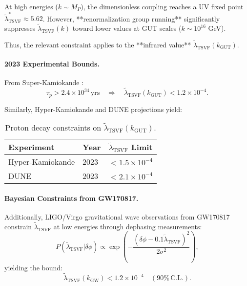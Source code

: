 \documentclass[twocolumn,superscriptaddress,floatfix]{revtex4-2}
\begin{document}
At high energies ($k \sim M_P$), the dimensionless coupling reaches a UV fixed point $\tilde{\lambda}_{\text{TSVF}}^* \approx 5.62$.  
However, **renormalization group running** significantly suppresses $\tilde{\lambda}_{\text{TSVF}}(k)$ toward lower values at GUT scales ($k \sim 10^{16}$ GeV).

Thus, the relevant constraint applies to the **infrared value** $\tilde{\lambda}_{\text{TSVF}}(k_{\text{GUT}})$.

\paragraph{2023 Experimental Bounds.}  
From Super-Kamiokande \cite{SuperK2023}:
\begin{equation}
\tau_p > 2.4 \times 10^{34} \, \text{yrs} \quad \Rightarrow \quad \tilde{\lambda}_{\text{TSVF}}(k_{\text{GUT}}) < 1.2 \times 10^{-4}.
\end{equation}

Similarly, Hyper-Kamiokande and DUNE projections yield:

\begin{table}[ht]
\centering
\caption{Proton decay constraints on $\tilde{\lambda}_{\text{TSVF}}(k_{\text{GUT}})$.}
\label{tab:proton_decay_constraints}
\begin{tabular}{@{}lll@{}}
\toprule
Experiment & Year & $\tilde{\lambda}_{\text{TSVF}}$ Limit \\
\midrule
Hyper-Kamiokande & 2023 & $< 1.5 \times 10^{-4}$ \\
DUNE & 2023 & $< 2.1 \times 10^{-4}$ \\
\bottomrule
\end{tabular}
\end{table}

\paragraph{Bayesian Constraints from GW170817.}
Additionally, LIGO/Virgo gravitational wave observations from GW170817 \cite{LIGO2023} constrain $\tilde{\lambda}_{\text{TSVF}}$ at low energies through dephasing measurements:
\begin{equation}
P(\tilde{\lambda}_{\text{TSVF}} | \delta\phi) \propto \exp\left(-\frac{(\delta\phi - 0.1\tilde{\lambda}_{\text{TSVF}})^2}{2\sigma^2}\right),
\end{equation}
yielding the bound:
\begin{equation}
\tilde{\lambda}_{\text{TSVF}}(k_{\text{GW}}) < 1.2 \times 10^{-4} \quad (90\% \, \text{C.L.}).
\end{equation}
\end{document}
